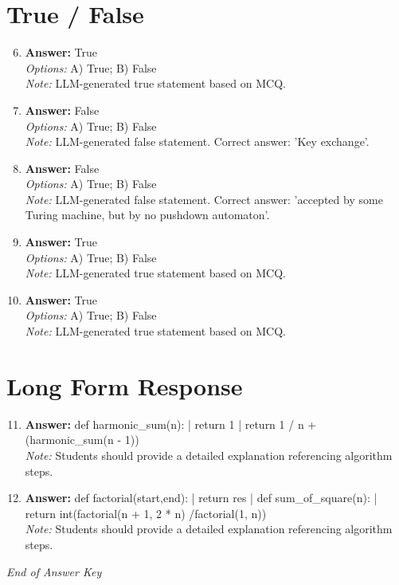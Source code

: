 \documentclass[12pt]{article}
\begin{document}
\section*{True / False}
\begin{enumerate}[label=\arabic*.]
\setcounter{enumi}{5}
\item \textbf{Answer:} True
\\ \textit{Options:} A) True; B) False
\\ \textit{Note:} LLM-generated true statement based on MCQ.
\item \textbf{Answer:} False
\\ \textit{Options:} A) True; B) False
\\ \textit{Note:} LLM-generated false statement. Correct answer: 'Key exchange'.
\item \textbf{Answer:} False
\\ \textit{Options:} A) True; B) False
\\ \textit{Note:} LLM-generated false statement. Correct answer: 'accepted by some Turing machine, but by no pushdown automaton'.
\item \textbf{Answer:} True
\\ \textit{Options:} A) True; B) False
\\ \textit{Note:} LLM-generated true statement based on MCQ.
\item \textbf{Answer:} True
\\ \textit{Options:} A) True; B) False
\\ \textit{Note:} LLM-generated true statement based on MCQ.
\end{enumerate}

\section*{Long Form Response}
\begin{enumerate}[label=\arabic*.]
\setcounter{enumi}{10}
\item \textbf{Answer:} def harmonic\_sum(n): | return 1 | return 1 / n + (harmonic\_sum(n - 1))
\\ \textit{Note:} Students should provide a detailed explanation referencing algorithm steps.
\item \textbf{Answer:} def factorial(start,end): | return res | def sum\_of\_square(n): | return int(factorial(n + 1, 2 * n) /factorial(1, n))
\\ \textit{Note:} Students should provide a detailed explanation referencing algorithm steps.
\end{enumerate}

\vfill
\noindent\textit{End of Answer Key}
\end{document}
